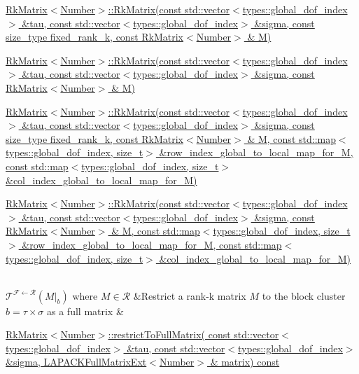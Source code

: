\begin{longtabu}
\begin{DoxyItemize}
\item \hyperlink{classRkMatrix_aa5aff0d31115d7a67ef2f11db0b4ea24}{Rk\+Matrix$<$\+Number$>$\+::\+Rk\+Matrix(const std\+::vector$<$types\+::global\+\_\+dof\+\_\+index$>$ \&tau, const std\+::vector$<$types\+::global\+\_\+dof\+\_\+index$>$ \&sigma, const size\+\_\+type fixed\+\_\+rank\+\_\+k, const Rk\+Matrix$<$\+Number$>$ \& M)}
\item \hyperlink{classRkMatrix_a311b3ac28f647cb191eeb97a0b9d5815}{Rk\+Matrix$<$\+Number$>$\+::\+Rk\+Matrix(const std\+::vector$<$types\+::global\+\_\+dof\+\_\+index$>$ \&tau, const std\+::vector$<$types\+::global\+\_\+dof\+\_\+index$>$ \&sigma, const Rk\+Matrix$<$\+Number$>$ \& M)}
\item \hyperlink{classRkMatrix_a5a2841fc6a697007fafcab2619fc5390}{Rk\+Matrix$<$\+Number$>$\+::\+Rk\+Matrix(const std\+::vector$<$types\+::global\+\_\+dof\+\_\+index$>$ \&tau, const std\+::vector$<$types\+::global\+\_\+dof\+\_\+index$>$ \&sigma, const size\+\_\+type fixed\+\_\+rank\+\_\+k, const Rk\+Matrix$<$\+Number$>$ \& M, const std\+::map$<$types\+::global\+\_\+dof\+\_\+index, size\+\_\+t$>$ \&row\+\_\+index\+\_\+global\+\_\+to\+\_\+local\+\_\+map\+\_\+for\+\_\+\+M, const std\+::map$<$types\+::global\+\_\+dof\+\_\+index, size\+\_\+t$>$ \&col\+\_\+index\+\_\+global\+\_\+to\+\_\+local\+\_\+map\+\_\+for\+\_\+\+M)}
\item \hyperlink{classRkMatrix_a89ad98e45e6ae6c23a6ffc478c7ebb9f}{Rk\+Matrix$<$\+Number$>$\+::\+Rk\+Matrix(const std\+::vector$<$types\+::global\+\_\+dof\+\_\+index$>$ \&tau, const std\+::vector$<$types\+::global\+\_\+dof\+\_\+index$>$ \&sigma, const Rk\+Matrix$<$\+Number$>$ \& M, const std\+::map$<$types\+::global\+\_\+dof\+\_\+index, size\+\_\+t$>$ \&row\+\_\+index\+\_\+global\+\_\+to\+\_\+local\+\_\+map\+\_\+for\+\_\+\+M, const std\+::map$<$types\+::global\+\_\+dof\+\_\+index, size\+\_\+t$>$ \&col\+\_\+index\+\_\+global\+\_\+to\+\_\+local\+\_\+map\+\_\+for\+\_\+\+M)}
\end{DoxyItemize}\\
$\mathcal{T}^{\mathcal{F} \leftarrow \mathcal{R}}(M\vert_b)$ where $M \in \mathcal{R}$ &Restrict a rank-\/k matrix $M$ to the block cluster $b = \tau \times \sigma$ as a full matrix &
\begin{DoxyItemize}
\item \hyperlink{classRkMatrix_a5305306386e47bcded819ce8d7f7935c}{Rk\+Matrix$<$\+Number$>$\+::restrict\+To\+Full\+Matrix( const std\+::vector$<$types\+::global\+\_\+dof\+\_\+index$>$ \&tau, const std\+::vector$<$types\+::global\+\_\+dof\+\_\+index$>$ \&sigma, L\+A\+P\+A\+C\+K\+Full\+Matrix\+Ext$<$\+Number$>$ \& matrix) const}

\end{DoxyItemize}
\end{longtabu}
